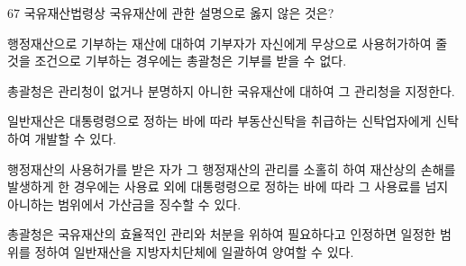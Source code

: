 \begin{question}{67}
국유재산법령상 국유재산에 관한 설명으로 옳지 않은 것은?
\begin{choices}
  \item 행정재산으로 기부하는 재산에 대하여 기부자가 자신에게 무상으로 사용허가하여 줄 것을 조건으로 기부하는 경우에는 총괄청은 기부를 받을 수 없다.
  \item 총괄청은 관리청이 없거나 분명하지 아니한 국유재산에 대하여 그 관리청을 지정한다.
  \item 일반재산은 대통령령으로 정하는 바에 따라 부동산신탁을 취급하는 신탁업자에게 신탁하여 개발할 수 있다.
  \item 행정재산의 사용허가를 받은 자가 그 행정재산의 관리를 소홀히 하여 재산상의 손해를 발생하게 한 경우에는 사용료 외에 대통령령으로 정하는 바에 따라 그 사용료를 넘지 아니하는 범위에서 가산금을 징수할 수 있다.
  \item 총괄청은 국유재산의 효율적인 관리와 처분을 위하여 필요하다고 인정하면 일정한 범위를 정하여 일반재산을 지방자치단체에 일괄하여 양여할 수 있다.
\end{choices}
\end{question}
